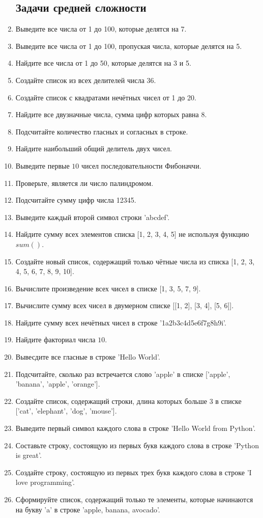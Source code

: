 \documentclass[a4,12pt]{article}
\theoremstyle{remark}
\begin{document}
\begin{enumerate}
    \subsection*{Задачи средней сложности}
    \item Выведите все числа от 1 до 100, которые делятся на 7.
    \item Выведите все числа от 1 до 100, пропуская числа, которые делятся на 5.
    \item Найдите все числа от 1 до 50, которые делятся на 3 и 5.
    \item Создайте список из всех делителей числа 36.
    \item Создайте список с квадратами нечётных чисел от 1 до 20.
    \item Найдите все двузначные числа, сумма цифр которых равна 8.
    \item Подсчитайте количество гласных и согласных в строке.
    \item Найдите наибольший общий делитель двух чисел.
    \item Выведите первые $10$ чисел последовательности Фибоначчи.
    \item Проверьте, является ли число палиндромом.
    \item Подсчитайте сумму цифр числа 12345.
    \item Выведите каждый второй символ строки 'abcdef'.
    \item Найдите сумму всех элементов списка [1, 2, 3, 4, 5] не используя функцию $sum()$.
    \item Создайте новый список, содержащий только чётные числа из списка [1, 2, 3, 4, 5, 6, 7, 8, 9, 10].
    \item Вычислите произведение всех чисел в списке [1, 3, 5, 7, 9].
    \item Вычислите сумму всех чисел в двумерном списке [[1, 2], [3, 4], [5, 6]].
    \item Найдите сумму всех нечётных чисел в строке '1a2b3c4d5e6f7g8h9i'.
    \item Найдите факториал числа $10$.
    \item Вывесдите все гласные в строке 'Hello World'.
    \item Подсчитайте, сколько раз встречается слово 'apple' в списке ['apple', 'banana', 'apple', 'orange'].
    \item Создайте список, содержащий строки, длина которых больше 3 в списке ['cat', 'elephant', 'dog', 'mouse'].
    \item Выведите первый символ каждого слова в строке 'Hello World from Python'.
    \item Составьте строку, состоящую из первых букв каждого слова в строке 'Python is great'.
    \item Создайте строку, состоящую из первых трех букв каждого слова в строке 'I love programming'.
    \item Сформируйте список, содержащий только те элементы, которые начинаются на букву 'a' в строке 'apple, banana, avocado'.
    

\end{enumerate}
\end{document}
